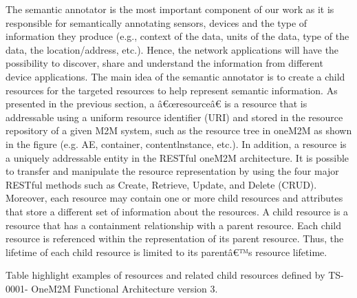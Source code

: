The semantic annotator is the most important component of our work as it is responsible for semantically annotating sensors, devices and the type of information they produce (e.g., context of the data, units of the data, type of the data, the location/address, etc.). Hence, the network applications will have the possibility to discover, share and understand the information from different device applications. The main idea of the semantic annotator is to create a child resources for the targeted resources to help represent semantic information. As presented in the previous section, a â€œresourceâ€ is a resource that is addressable using a uniform resource identifier (URI) and stored in the resource repository of a given M2M system, such as the resource tree in oneM2M as shown in the figure (e.g. AE, container, contentlnstance, etc.). In addition, a resource is a uniquely addressable entity in the RESTful oneM2M architecture. It is possible to transfer and manipulate the resource representation by using the four major RESTful methods such as Create, Retrieve, Update, and Delete (CRUD). Moreover, each resource may contain one or more child resources and attributes that store a different set of information about the resources. A child resource is a resource that has a containment relationship with a parent resource. Each child resource is referenced within the representation of its parent resource. Thus, the lifetime of each child resource is limited to its parentâ€™s resource lifetime.\par
Table highlight examples of resources and related child resources defined by TS-0001- OneM2M Functional Architecture version 3. 


